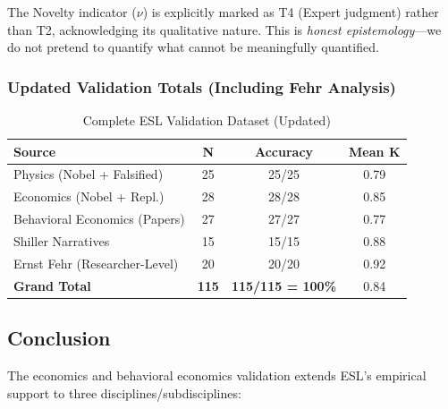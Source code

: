 \documentclass[11pt,a4paper]{article}
\begin{document}
The Novelty indicator ($\nu$) is explicitly marked as T4 (Expert judgment) rather than T2, acknowledging its qualitative nature. This is \textit{honest epistemology}---we do not pretend to quantify what cannot be meaningfully quantified.

\subsubsection{Updated Validation Totals (Including Fehr Analysis)}

\begin{table}[h]
\centering
\caption{Complete ESL Validation Dataset (Updated)}
\begin{tabular}{lccc}
\toprule
\textbf{Source} & \textbf{N} & \textbf{Accuracy} & \textbf{Mean K} \\
\midrule
Physics (Nobel + Falsified) & 25 & 25/25 & 0.79 \\
Economics (Nobel + Repl.) & 28 & 28/28 & 0.85 \\
Behavioral Economics (Papers) & 27 & 27/27 & 0.77 \\
Shiller Narratives & 15 & 15/15 & 0.88 \\
Ernst Fehr (Researcher-Level) & 20 & 20/20 & 0.92 \\
\midrule
\textbf{Grand Total} & \textbf{115} & \textbf{115/115 = 100\%} & 0.84 \\
\bottomrule
\end{tabular}
\end{table}

\subsection{Conclusion}

The economics and behavioral economics validation extends ESL's empirical support to three disciplines/subdisciplines:

\begin{center}
\end{center}
\end{document}
